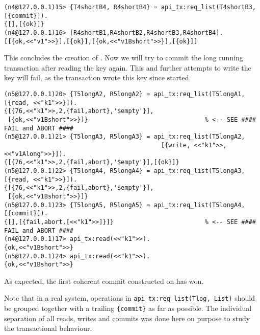 \begin{lstlisting}
(n4@127.0.0.1)15> {T4shortB4, R4shortB4} = api_tx:req_list(T4shortB3, [{commit}]).
{[],[{ok}]}
(n4@127.0.0.1)16> [R4shortB1,R4shortB2,R4shortB3,R4shortB4].
[[{ok,<<"v1">>}],[{ok}],[{ok,<<"v1Bshort">>}],[{ok}]]
\end{lstlisting}
This concludes the creation of . Now we will try to commit the long
running transaction  after reading the key  again. This and
further attempts to write the key will fail, as the transaction 
wrote this key since  started.
\begin{lstlisting}
(n5@127.0.0.1)20> {T5longA2, R5longA2} = api_tx:req_list(T5longA1, [{read, <<"k1">>}]).
{[{76,<<"k1">>,2,{fail,abort},'$empty'}],
 [{ok,<<"v1Bshort">>}]}                                % <-- SEE #### FAIL and ABORT ####
(n5@127.0.0.1)21> {T5longA3, R5longA3} = api_tx:req_list(T5longA2,
                                           [{write, <<"k1">>,<<"v1Along">>}]).
{[{76,<<"k1">>,2,{fail,abort},'$empty'}],[{ok}]}
(n5@127.0.0.1)22> {T5longA4, R5longA4} = api_tx:req_list(T5longA3, [{read, <<"k1">>}]).
{[{76,<<"k1">>,2,{fail,abort},'$empty'}],
 [{ok,<<"v1Bshort">>}]}
(n5@127.0.0.1)23> {T5longA5, R5longA5} = api_tx:req_list(T5longA4, [{commit}]).
{[],[{fail,abort,[<<"k1">>]}]}                         % <-- SEE #### FAIL and ABORT ####
(n4@127.0.0.1)17> api_tx:read(<<"k1">>).
{ok,<<"v1Bshort">>}
(n5@127.0.0.1)24> api_tx:read(<<"k1">>).
{ok,<<"v1Bshort">>}
\end{lstlisting}

As expected, the first coherent commit  constructed on  has
won.

Note that in a real system, operations in \lstinline|api_tx:req_list(Tlog, List)| should be grouped together with a trailing \lstinline|{commit}| as
far as possible. The individual separation of all reads, writes and commits
was done here on purpose to study the transactional behaviour.

